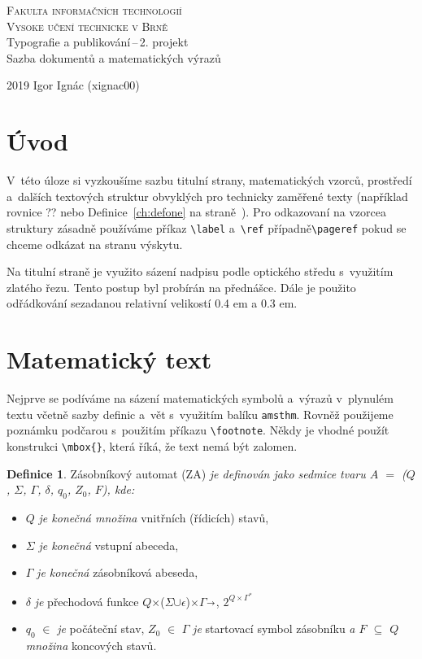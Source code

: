\documentclass[a4paper, titlepage, twocolumn, 11pt]{article}
\theoremstyle{definition}
\newtheorem{defn}{Definice}
\begin{document}
  \begin{titlepage}
    \begin{center}
        \Huge \textsc{Fakulta informačních technologií\\ Vysoke učení technicke v Brně}\\
        \LARGE
        Typografie a publikování\,--\,2. projekt\\
        Sazba dokumentů a matematických výrazů
    \end{center}
    {\Large 2019 \hfill Igor Ignác (xignac00)}
  \end{titlepage}

\section*{Úvod}
\label{fig:pageone}
V~této úloze si vyzkoušíme sazbu titulní strany, matematických vzorců, prostředí a~dalších textových struktur obvyklých pro technicky zaměřené texty (například rovnice ?? nebo Definice~\ref{ch:defone} na straně~\pageref{fig:pageone}). Pro odkazovaní na vzorcea struktury zásadně používáme příkaz \verb|\label| a~\verb|\ref| případně\verb|\pageref| pokud se chceme odkázat na stranu výskytu.
\par
Na titulní straně je využito sázení nadpisu podle optického středu s~využitím zlatého řezu. Tento postup byl probírán na přednášce. Dále je použito odřádkování sezadanou relativní velikostí 0.4 em a 0.3 em.

\section{Matematický text}
Nejprve se podíváme na sázení matematických symbolů a~výrazů v~plynulém textu včetně sazby definic a~vět s~využitím balíku \verb|amsthm|. Rovněž použijeme poznámku podčarou s~použitím příkazu \verb|\footnote|. Někdy je vhodné použít konstrukci \verb|\mbox{}|, která říká, že text nemá být zalomen.
\par
\begin{defn}
Zásobníkový automat (ZA) \emph{je definován jako sedmice tvaru $A$ $=$ ($Q$, $\Sigma$, $\Gamma$, $\delta$, $q_0$, $Z_0$, $F$), kde: }

  \begin{itemize}
    \item $Q$ \emph{je konečná množina} vnitřních (řídicích) stavů,
    \item $\Sigma$ \emph{je konečná} vstupní abeceda,
    \item $\Gamma$ \emph{je konečná} zásobníková abeseda,
    \item $\delta$ \emph{je} přechodová funkce $Q$$\times$($\Sigma$$\cup${$\epsilon$})$\times$$\Gamma$$\shortrightarrow$, $2^{Q\times\Gamma^\ast}$
    \item $q_0$ $\in$ \emph{je} počáteční stav, $Z_0$ $\in$ $\Gamma$ \emph{je} startovací symbol zásobníku \emph{a $F$ $\subseteq$ $Q$ množina} koncových stavů.

  \end{itemize}
\end{defn}
\end{document}
